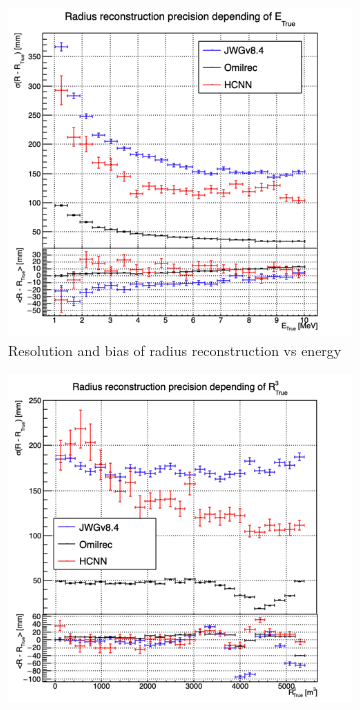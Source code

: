 \documentclass[../main.tex]{subfiles}
\begin{document}
\begin{figure}[ht]
  \centering
  \begin{subfigure}[t]{0.48\linewidth}
    \centering
    \includegraphics[width=\linewidth]{images/jgnn/hcnn/MSBvETC.png}
    \caption{Resolution and bias of radius reconstruction vs energy}
    \label{fig:jgnn:MSBvETC_hcnn}
  \end{subfigure}
  \begin{subfigure}[t]{0.48\linewidth}
    \centering
    \includegraphics[width=\linewidth]{images/jgnn/hcnn/MSBvRTC.png}

\end{subfigure}
\end{figure}
\end{document}
